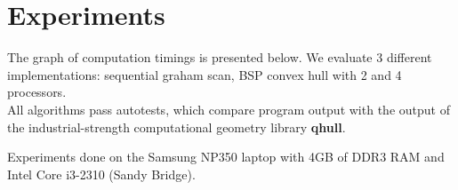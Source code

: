\documentclass[a4paper]{article}
\begin{document}
\begin{figure}[htb!]
        \hfill
    \end{figure}

\section {Experiments}
    The graph of computation timings is presented below. 
    We evaluate 3 different implementations:
    sequential graham scan, BSP convex hull with 2 and 4 processors.\\
    All algorithms pass autotests, which compare program output with the
    output of the industrial-strength computational geometry library \textbf{qhull}.\\
    \begin {figure}[htb!]
        \captionsetup[subfigure]{labelformat=empty}
        \centering
    \end {figure}
    Experiments done on the Samsung NP350 laptop with 4GB of DDR3 RAM and
    Intel Core i3-2310 (Sandy Bridge).
\end{document}

